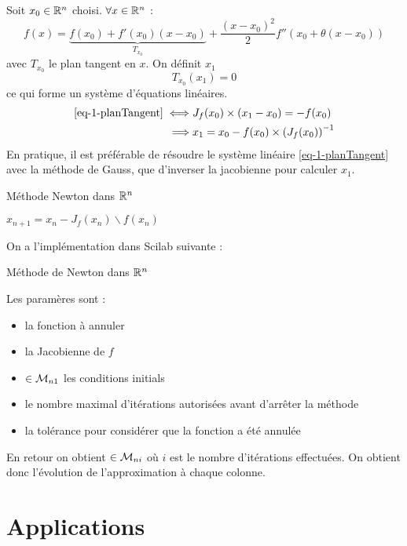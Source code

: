 		Soit $x_0 \in \mathbb{R}^n$ choisi. $\forall x \in \mathbb{R}^n$ :
		$$
			f(x) = \underbrace{f(x_0) + f'(x_0)(x-x_0)}_{T_{x_0}} + \frac{(x-x_0)^2}{2}f''(x_0 +\theta(x-x_0))
		$$
		avec $T_{x_0}$ le plan tangent en $x$.
		On définit $x_1$ \tq 
		\begin{equation}
			\label{eq-1-planTangent}
			T_{x_0}(x_1) = 0
		\end{equation}
		ce qui forme un système d'équations linéaires.
		\begin{align*}
			\eqref{eq-1-planTangent} \iff		& J_f(x_0)\times(x_1 -x_0) = -f(x_0)		\\
									\implies 	& x_1 = x_0 - f(x_0) \times \left(J_f(x_0)\right)^{-1}
		\end{align*}
		En pratique, il est préférable de résoudre le système linéaire \eqref{eq-1-planTangent} avec la méthode de Gauss, que d'inverser la jacobienne pour calculer $x_1$.

		\begin{algorithm}[H]
		\caption{Méthode Newton dans $\mathbb{R}^n$}
			{
				$x_{n+1} = x_n - J_f(x_n) \backslash f(x_n)$\;
			}
		\end{algorithm}

		On a l'implémentation dans Scilab suivante :
		\begin{listing}[H]
			\caption{Méthode de Newton dans $\R^n$}
			\label{code-1-newtonRn}
		\end{listing}

		Les paramères sont :
		\begin{itemize}
			\item {} la fonction à annuler
			\item {} la Jacobienne de $f$
			\item {} $\in\mathcal{M}_{n1}$ les conditions initials
			\item {} le nombre maximal d'itérations autorisées avant d'arrêter la méthode
			\item {} la tolérance pour considérer que la fonction a été annulée
		\end{itemize}
		En retour on obtient  $\in \mathcal{M}_{ni}$ où $i$ est le nombre d'itérations effectuées. On obtient donc l'évolution de l'approximation à chaque colonne.


\section{Applications}

